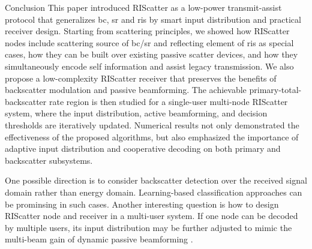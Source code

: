 \documentclass[journal]{IEEEtran}
\begin{document}
\begin{section}{Conclusion}
	This paper introduced RIScatter as a low-power transmit-assist protocol that generalizes \gls{bc}, \gls{sr} and \gls{ris} by smart input distribution and practical receiver design.
	Starting from scattering principles, we showed how RIScatter nodes include scattering source of \gls{bc}/\gls{sr} and reflecting element of \gls{ris} as special cases, how they can be built over existing passive scatter devices, and how they simultaneously encode self information and assist legacy transmission.
	We also propose a low-complexity RIScatter receiver that preserves the benefits of backscatter modulation and passive beamforming.
	The achievable primary-total-backscatter rate region is then studied for a single-user multi-node RIScatter system, where the input distribution, active beamforming, and decision thresholds are iteratively updated.
	Numerical results not only demonstrated the effectiveness of the proposed algorithms, but also emphasized the importance of adaptive input distribution and cooperative decoding on both primary and backscatter subsystems.

	One possible direction is to consider backscatter detection over the received signal domain rather than energy domain.
	Learning-based classification approaches can be prominsing in such cases.
	Another interesting question is how to design RIScatter node and receiver in a multi-user system.
	If one node can be decoded by multiple users, its input distribution may be further adjusted to mimic the multi-beam gain of dynamic passive beamforming \cite{Qiu2022}.
\end{section}
\end{document}
